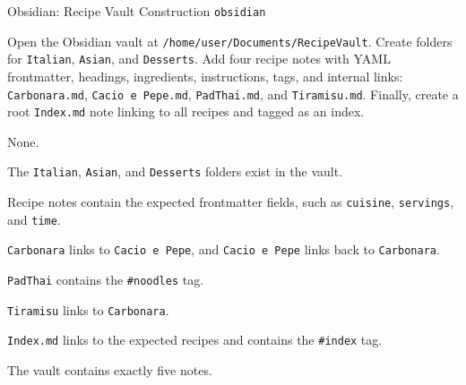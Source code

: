 \begin{taskexample}{Obsidian: Recipe Vault Construction}
 \texttt{obsidian}

 Open the Obsidian vault at
\texttt{/home/user/Documents/RecipeVault}. Create folders for
\texttt{Italian}, \texttt{Asian}, and \texttt{Desserts}. Add four recipe notes
with YAML frontmatter, headings, ingredients, instructions, tags, and internal
links: \texttt{Carbonara.md}, \texttt{Cacio e Pepe.md},
\texttt{PadThai.md}, and \texttt{Tiramisu.md}. Finally, create a root
\texttt{Index.md} note linking to all recipes and tagged as an index.

None.

\begin{compactitem}
    \item The \texttt{Italian}, \texttt{Asian}, and \texttt{Desserts} folders
    exist in the vault.
    \item Recipe notes contain the expected frontmatter fields, such as
    \texttt{cuisine}, \texttt{servings}, and \texttt{time}.
    \item \texttt{Carbonara} links to \texttt{Cacio e Pepe}, and
    \texttt{Cacio e Pepe} links back to \texttt{Carbonara}.
    \item \texttt{PadThai} contains the \texttt{\#noodles} tag.
    \item \texttt{Tiramisu} links to \texttt{Carbonara}.
    \item \texttt{Index.md} links to the expected recipes and contains the
    \texttt{\#index} tag.
    \item The vault contains exactly five notes.
\end{compactitem}
\end{taskexample}


